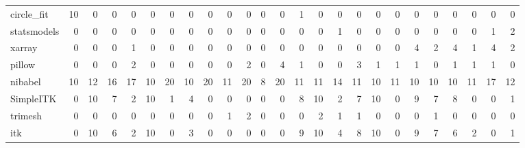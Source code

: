 \begin{tabular}{lrrrrrrrrrrrrrrrrrrrrrrrr}
circle\_fit & 10 & 0 & 0 & 0 & 0 & 0 & 0 & 0 & 0 & 0 & 0 & 0 & 1 & 0 & 0 & 0 & 0 & 0 & 0 & 0 & 0 & 0 & 0 & 0 \\
statsmodels & 0 & 0 & 0 & 0 & 0 & 0 & 0 & 0 & 0 & 0 & 0 & 0 & 0 & 0 & 1 & 0 & 0 & 0 & 0 & 0 & 0 & 0 & 1 & 2 \\
xarray & 0 & 0 & 0 & 1 & 0 & 0 & 0 & 0 & 0 & 0 & 0 & 0 & 0 & 0 & 0 & 0 & 0 & 0 & 4 & 2 & 4 & 1 & 4 & 2 \\
pillow & 0 & 0 & 0 & 2 & 0 & 0 & 0 & 0 & 0 & 2 & 0 & 4 & 1 & 0 & 0 & 3 & 1 & 1 & 1 & 0 & 1 & 1 & 1 & 0 \\
nibabel & 10 & 12 & 16 & 17 & 10 & 20 & 10 & 20 & 11 & 20 & 8 & 20 & 11 & 11 & 14 & 11 & 10 & 11 & 10 & 10 & 10 & 11 & 17 & 12 \\
SimpleITK & 0 & 10 & 7 & 2 & 10 & 1 & 4 & 0 & 0 & 0 & 0 & 0 & 8 & 10 & 2 & 7 & 10 & 0 & 9 & 7 & 8 & 0 & 0 & 1 \\
trimesh & 0 & 0 & 0 & 0 & 0 & 0 & 0 & 0 & 1 & 2 & 0 & 0 & 0 & 2 & 1 & 1 & 0 & 0 & 0 & 1 & 0 & 0 & 0 & 0 \\
itk & 0 & 10 & 6 & 2 & 10 & 0 & 3 & 0 & 0 & 0 & 0 & 0 & 9 & 10 & 4 & 8 & 10 & 0 & 9 & 7 & 6 & 2 & 0 & 1 \\
\bottomrule
\end{tabular}
